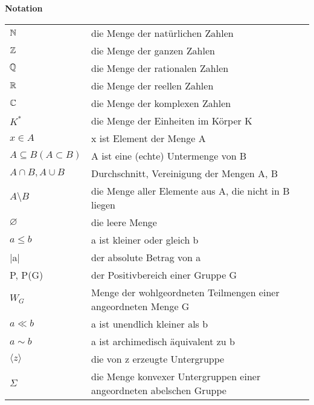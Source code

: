 \newpage
{\LARGE \textbf{Notation}}
\vspace{1.6cm}
\begin{center}
\begin{tabular}{ll}
  $\mathbb{N}$ & die Menge der natürlichen Zahlen \\
  $\mathbb{Z}$ & die Menge der ganzen Zahlen\\
  $\mathbb{Q}$ & die Menge der rationalen Zahlen\\
  $\mathbb{R}$ & die Menge der reellen Zahlen\\
  $\mathbb{C}$ & die Menge der komplexen Zahlen\\
  $K^*$& die Menge der Einheiten im Körper K\\
  $x \in A$ & x ist Element der Menge A\\
  $A\subseteq B (A \subset B)$& A ist eine (echte) Untermenge von B \\
  $A \cap B, A \cup B$ & Durchschnitt, Vereinigung der Mengen A, B\\
  $A \setminus B$ & die Menge aller Elemente aus A, die nicht in B liegen \\
  $\varnothing$ & die leere Menge \\
  $ a \leq b$ & a ist kleiner oder gleich b\\
  |a| & der absolute Betrag von a\\
  P, P(G) & der Positivbereich einer Gruppe G \\
  $W_G$ & Menge der wohlgeordneten Teilmengen einer angeordneten Menge G\\
  $a \ll b$ & a ist unendlich kleiner als b\\
  $a \sim b$ & a ist archimedisch äquivalent zu b\\
  $\langle z \rangle$ & die von z erzeugte Untergruppe\\
  $\Sigma$ & die Menge konvexer Untergruppen einer angeordneten abelschen Gruppe\\
 \end{tabular}
\end{center}